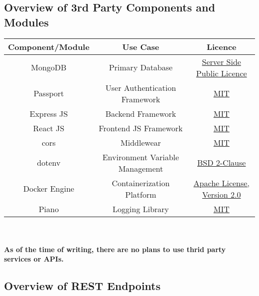 \subsection{Overview of 3rd Party Components and Modules}

\begin{tabular}{|c|c|c|}
    \hline
    \textbf{Component/Module}& \textbf{Use Case}&\textbf{Licence}\\%

    \hline
    MongoDB & Primary Database & \href{https://www.mongodb.com/legal/licensing/server-side-public-license}{Server Side Public Licence}\\ 
    \hline
    Passport & User Authentication Framework & \href{https://github.com/jaredhanson/passport/blob/master/LICENSE}{MIT}\\ 
    \hline
    Express JS & Backend Framework & \href{https://github.com/expressjs/express/blob/master/LICENSE}{MIT}\\ 
    \hline
    React JS & Frontend JS Framework & \href{https://github.com/facebook/react/blob/main/LICENSE}{MIT}\\
    \hline
    cors & Middlewear & \href{https://www.npmjs.com/package/cors}{MIT}\\
    \hline
    dotenv & Environment Variable Management & \href{https://github.com/motdotla/dotenv/blob/master/LICENSE}{BSD 2-Clause}\\
    \hline
    Docker Engine & Containerization Platform & \href{https://github.com/moby/moby/blob/master/LICENSE}{Apache License, Version 2.0}\\ 
    \hline
    Piano & Logging Library & \href{https://github.com/pinojs/pino/blob/main/LICENSE}{MIT}\\
    \hline
\end{tabular}\\\\
\textbf{As of the time of writing, there are no plans to use thrid party services or APIs.}

\subsection{Overview of REST Endpoints}

